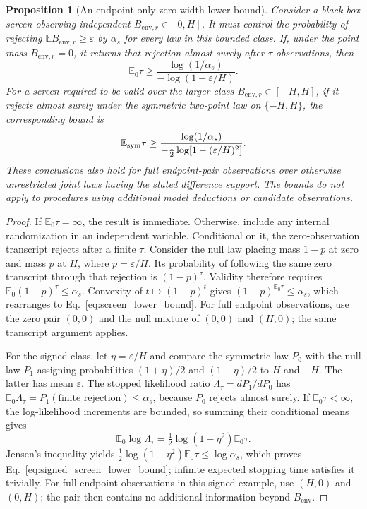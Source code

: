 \documentclass[preprint,11pt,sort&compress]{elsarticle}
\newtheorem{proposition}[theorem]{Proposition}
\newcommand{\E}{\mathbb E}
\begin{document}
\begin{proposition}[An endpoint-only zero-width lower bound]
\label{prop:screen_lower_bound}
Consider a black-box screen observing independent $B_{\mathrm{env},r}\in[0,H]$. It must
control the probability of rejecting $\E B_{\mathrm{env},r}\ge\varepsilon$ by
$\alpha_s$ for every law in this bounded class. If, under the point mass
$B_{\mathrm{env},r}=0$, it returns that rejection almost surely after $\tau$ observations,
then
\begin{equation}
 \E_0\tau\ge
 \frac{\log(1/\alpha_s)}{-\log(1-\varepsilon/H)}.
 \label{eq:screen_lower_bound}
\end{equation}
For a screen required to be valid over the larger class $B_{\mathrm{env},r}\in[-H,H]$,
if it rejects almost surely under the symmetric two-point law on
$\{-H,H\}$, the corresponding bound is
\begin{equation}
 \E_{\rm sym}\tau\ge
 \frac{\log(1/\alpha_s)}{-\tfrac12\log[1-(\varepsilon/H)^2]}.
 \label{eq:signed_screen_lower_bound}
\end{equation}
These conclusions also hold for full endpoint-pair observations over
otherwise unrestricted joint laws having the stated difference support. The bounds do not apply
to procedures using additional model deductions or candidate observations.
\end{proposition}
\begin{proof}
If $\E_0\tau=\infty$, the result is immediate. Otherwise, include any
internal randomization in an independent variable. Conditional on it,
the zero-observation transcript rejects after a finite $\tau$. Consider
the null law placing mass $1-p$ at zero and mass $p$ at $H$, where
$p=\varepsilon/H$. Its probability of following the same zero transcript
through that rejection is $(1-p)^\tau$. Validity therefore requires
$\E_0(1-p)^\tau\le\alpha_s$. Convexity of $t\mapsto(1-p)^t$ gives
$(1-p)^{\E_0\tau}\le\alpha_s$, which rearranges to
Eq.~\ref{eq:screen_lower_bound}. For full endpoint observations, use the
zero pair $(0,0)$ and the null mixture of $(0,0)$ and $(H,0)$; the same
transcript argument applies.

For the signed class, let $\eta=\varepsilon/H$ and compare the symmetric
law $P_0$ with the null law $P_1$ assigning probabilities $(1+\eta)/2$
and $(1-\eta)/2$ to $H$ and $-H$. The latter has mean $\varepsilon$.
The stopped likelihood ratio $\Lambda_\tau=dP_1/dP_0$ has
$\E_0\Lambda_\tau=P_1(\text{finite rejection})\le\alpha_s$, because
$P_0$ rejects almost surely. If $\E_0\tau<\infty$, the log-likelihood
increments are bounded, so summing their conditional means gives
\[
 \E_0\log\Lambda_\tau
  =\tfrac12\log(1-\eta^2)\E_0\tau.
\]
Jensen's inequality yields
$\tfrac12\log(1-\eta^2)\E_0\tau\le\log\alpha_s$,
which proves Eq.~\ref{eq:signed_screen_lower_bound}; infinite expected
stopping time satisfies it trivially. For full endpoint observations in
this signed example, use $(H,0)$ and $(0,H)$; the pair then contains no
additional information beyond $B_{\mathrm{env}}$.
\end{proof}
\end{document}
